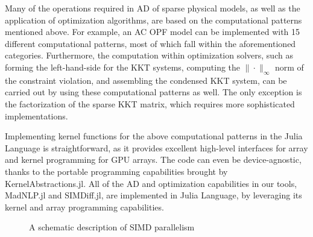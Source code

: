 Many of the operations required in AD of sparse physical models, as
well as the application of optimization algorithms, are based on the
computational patterns mentioned above. For example, an AC OPF model can
be implemented with 15 different computational patterns, most of which
fall within the aforementioned categories. Furthermore, the
computation within optimization solvers, such as forming the
left-hand-side for the KKT systems, computing the $\|\cdot\|_\infty$
norm of the constraint violation, and assembling the condensed KKT
system, can be carried out by using these computational patterns as well. The
only exception is the factorization of the sparse KKT matrix, which
requires more sophisticated implementations.

Implementing kernel functions for the above computational patterns in
the Julia Language is straightforward, as it provides excellent
high-level interfaces for array and kernel programming for GPU
arrays. The code can even be device-agnostic, thanks to the portable
programming capabilities brought by KernelAbstractions.jl. All
of the AD and optimization capabilities in our
tools, MadNLP.jl and SIMDiff.jl, are implemented in Julia Language,
by leveraging its kernel and array programming capabilities.

\begin{figure}[t]
  \centering 
  \label{fig:simd}
  \caption{A schematic description of SIMD parallelism}
\end{figure}

